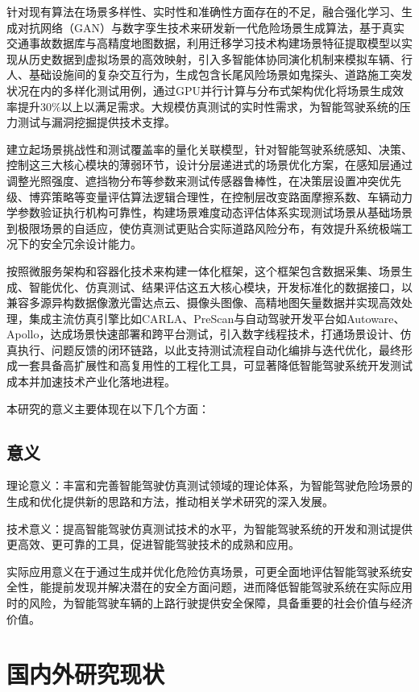 针对现有算法在场景多样性、实时性和准确性方面存在的不足，融合强化学习、生成对抗网络（GAN）与数字孪生技术来研发新一代危险场景生成算法，基于真实交通事故数据库与高精度地图数据，利用迁移学习技术构建场景特征提取模型以实现从历史数据到虚拟场景的高效映射，引入多智能体协同演化机制来模拟车辆、行人\cite{苏江平2017基于中国危险工况的行人交通冲突典型场景提取与分析}、基础设施间的复杂交互行为，生成包含长尾风险场景如鬼探头、道路施工突发状况在内的多样化测试用例，通过GPU并行计算与分布式架构优化将场景生成效率提升30\%以上以满足需求。大规模仿真测试的实时性需求，为智能驾驶系统的压力测试与漏洞挖掘提供技术支撑。​

建立起场景挑战性和测试覆盖率的量化关联模型，针对智能驾驶系统感知、决策、控制这三大核心模块的薄弱环节，设计分层递进式的场景优化方案，在感知层通过调整光照强度、遮挡物分布等参数来测试传感器鲁棒性，在决策层设置冲突优先级、博弈策略等变量评估算法逻辑合理性，在控制层改变路面摩擦系数、车辆动力学参数验证执行机构可靠性，构建场景难度动态评估体系实现测试场景从基础场景到极限场景的自适应，使仿真测试更贴合实际道路风险分布，有效提升系统极端工况下的安全冗余设计能力。​​

按照微服务架构和容器化技术来构建一体化框架，这个框架包含数据采集、场景生成、智能优化、仿真测试、结果评估这五大核心模块，开发标准化的数据接口，以兼容多源异构数据像激光雷达点云、摄像头图像、高精地图矢量数据并实现高效处理，集成主流仿真引擎比如CARLA、PreScan与自动驾驶开发平台如Autoware、Apollo，达成场景快速部署和跨平台测试，引入数字线程技术，打通场景设计、仿真执行、问题反馈的闭环链路，以此支持测试流程自动化编排与迭代优化，最终形成一套具备高扩展性和高复用性的工程化工具，可显著降低智能驾驶系统开发测试成本并加速技术产业化落地进程。

本研究的意义主要体现在以下几个方面：

\subsection{意义}
理论意义：丰富和完善智能驾驶仿真测试领域的理论体系，为智能驾驶危险场景的生成和优化提供新的思路和方法，推动相关学术研究的深入发展。

技术意义：提高智能驾驶仿真测试技术的水平，为智能驾驶系统的开发和测试提供更高效、更可靠的工具，促进智能驾驶技术的成熟和应用。

实际应用意义在于通过生成并优化危险仿真场景，可更全面地评估智能驾驶系统安全性，能提前发现并解决潜在的安全方面问题，进而降低智能驾驶系统在实际应用时的风险，为智能驾驶车辆的上路行驶提供安全保障，具备重要的社会价值与经济价值。

\section{国内外研究现状}

